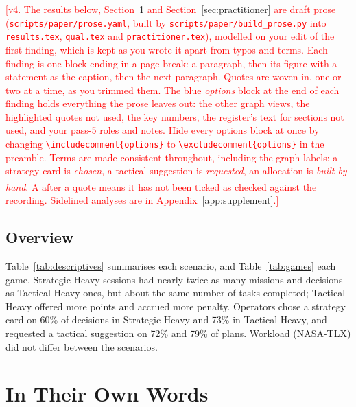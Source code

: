 \documentclass[10pt]{article}
\theoremstyle{definition}
\newcommand{\todo}[1]{\textcolor{red}{[#1]}}
\newcommand{\unchecked}{\textsuperscript{\dag}}
\begin{document}
\todo{v4. The results below, Section~\ref{sec:qual} and Section~\ref{sec:practitioner} are draft prose
(\texttt{scripts/paper/prose.yaml}, built by \texttt{scripts/paper/build\_prose.py} into \texttt{results.tex},
\texttt{qual.tex} and \texttt{practitioner.tex}), modelled on your edit of the first finding, which is kept as you
wrote it apart from typos and terms. Each finding is one block ending in a page break: a paragraph, then its figure
with a statement as the caption, then the next paragraph. Quotes are woven in, one or two at a time, as you trimmed
them. The blue \emph{options} block at the end of each finding holds everything the prose leaves out: the other
graph views, the highlighted quotes not used, the key numbers, the register's text for sections not used, and your
pass-5 roles and notes. Hide every options block at once by changing \texttt{\textbackslash includecomment\{options\}}
to \texttt{\textbackslash excludecomment\{options\}} in the preamble. Terms are made consistent throughout,
including the graph labels: a strategy card is \emph{chosen}, a tactical suggestion is \emph{requested}, an allocation
is \emph{built by hand}. A \unchecked{} after a quote means it has not been ticked as checked against the recording.
Sidelined analyses are in Appendix~\ref{app:supplement}.}

\subsection{Overview}\label{sec:res:overview}

Table~\ref{tab:descriptives} summarises each scenario, and Table~\ref{tab:games} each game. Strategic Heavy sessions
had nearly twice as many missions and decisions as Tactical Heavy ones, but about the same number of tasks completed;
Tactical Heavy offered more points and accrued more penalty. Operators chose a strategy card on 60\% of decisions in
Strategic Heavy and 73\% in Tactical Heavy, and requested a tactical suggestion on 72\% and 79\% of plans. Workload (NASA-TLX) did not
differ between the scenarios.



\FloatBarrier


\section{In Their Own Words}\label{sec:qual}
\end{document}
